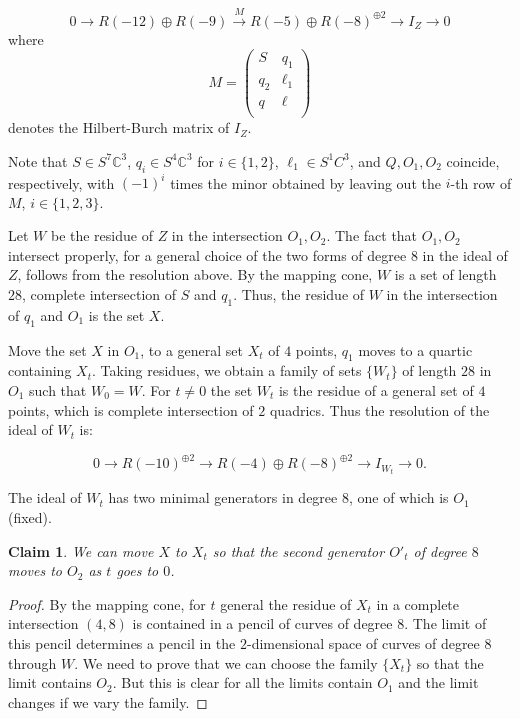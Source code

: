 \documentclass{amsart}
\newcommand{\C}{\mathbb{C}}
\newtheorem{claim0}[thm0]{Claim}
\theoremstyle{definition}
\begin{document}
\begin{equation}\label{eq:idZvee}
0 \rightarrow R(-12) \oplus R(-9)  \xrightarrow M R(-5) \oplus R(-8)^{\oplus 2} \rightarrow I_Z \rightarrow 0
\end{equation}
where 
\begin{equation}\label{M588}
M = \begin{pmatrix} S & q_{1} \\ q_{2} & \ell_{1}\\ q & \ell\\ \end{pmatrix}
\end{equation}
denotes the Hilbert-Burch matrix of $ I_Z $. 


Note that $ S \in S^7\C^{3} $, $ q_{i} \in S^{4}\C^{3} $ for $ i \in \{1,2\} $,  $ \ell_1 \in S^{1}C^{3} $,  and  $ Q, O_{1}, O _{2} $ coincide, 
respectively, with $ (-1)^{i} $ times the minor obtained by leaving out the $ i $-th row of $ M $, $ i \in \{1,2,3\}. $ 
\smallskip

Let $W$ be the residue of $Z$ in the intersection $O_1,O_2$. The fact that $O_1,O_2$ intersect properly, for a general choice of the two forms of degree $8$
 in the ideal of $Z$, follows from the resolution above. By the mapping cone, $W$ is a set of length $28$, complete intersection of $S$ and $q_1$. Thus, the residue
 of $W$ in the intersection  of $q_1$ and $O_1$ is the set $X$.
 
 Move the set $X$ in $O_1$, to a general set $X_t$ of $4$ points, $q_1$ moves to a quartic containing $X_t$. Taking residues, we obtain a family of sets $\{W_t\}$
 of length $28$ in $O_1$ such that $W_0=W$. For $t\neq 0$ the set $W_t$ is the residue of a general set of $4$ points, which is complete intersection of $2$ quadrics.
 Thus the resolution of the ideal of $W_t$ is:
 
$$  0 \rightarrow R(-10)^{\oplus 2}  \rightarrow R(-4) \oplus R(-8)^{\oplus 2} \rightarrow I_{W_t} \rightarrow 0.$$

The ideal of $W_t$ has two minimal generators in degree $8$, one of which is $O_1$ (fixed). 

\begin{claim0}\label{cl:move}
We can move $X$ to $X_t$ so that 
the second generator $O'_t$ of degree $8$ moves to $O_2$ as $t$ goes to $0$.
\end{claim0}
\begin{proof} By the mapping cone, for $t$ general the residue of $X_t$ in a complete intersection $(4,8)$ is contained in a pencil of curves of degree $8$.
The limit of this pencil determines a pencil in the $2$-dimensional space of curves of degree $8$ through $W$. We need to prove that we can choose
the family $\{ X_t\}$ so that the limit contains $O_2$. But this is clear for all the limits contain $O_1$ and the limit changes if we vary the family. 
\end{proof}
\end{document}
